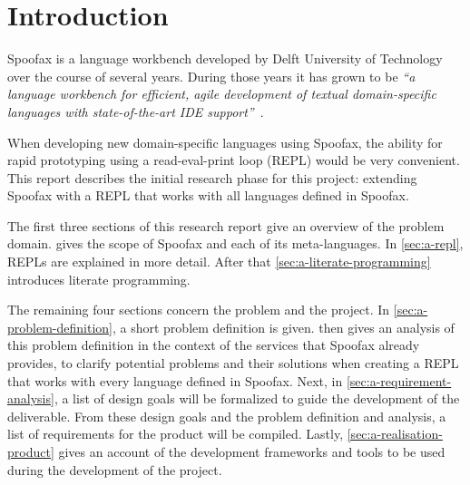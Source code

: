 \section*{Introduction}
\label{sec:a-introduction}

Spoofax is a language workbench developed by Delft University of
Technology over the course of several years. During those years it has
grown to be \textit{``a language workbench for efficient, agile
  development of textual domain-specific languages with
  state-of-the-art IDE support''}~\cite{Kats10a}.

When developing new domain-specific languages using Spoofax, the
ability for rapid prototyping using a read-eval-print loop (REPL)
would be very convenient. This report describes the initial research
phase for this project: extending Spoofax with a REPL that works with
all languages defined in Spoofax.

The first three sections of this research report give an overview of
the problem domain.  gives the scope of Spoofax and
each of its meta-languages. In \cref{sec:a-repl}, REPLs are explained in
more detail. After that \cref{sec:a-literate-programming} introduces
literate programming.

The remaining four sections concern the problem and the project. In
\cref{sec:a-problem-definition}, a short problem definition is given.
 then gives an analysis of this problem
definition in the context of the services that Spoofax already
provides, to clarify potential problems and their solutions when
creating a REPL that works with every language defined in Spoofax.
Next, in \cref{sec:a-requirement-analysis}, a list of design goals will
be formalized to guide the development of the deliverable. From these
design goals and the problem definition and analysis, a list of
requirements for the product will be compiled. Lastly,
\cref{sec:a-realisation-product} gives an account of the development
frameworks and tools to be used during the development of the
project.

